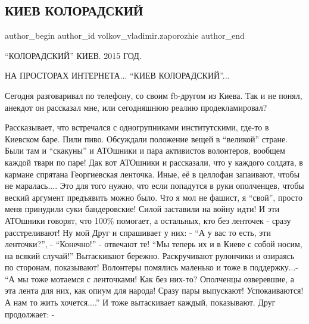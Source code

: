  
 
 
 
 
 
\subsection{КИЕВ КОЛОРАДСКИЙ}
\label{sec:31_01_2022.fb.volkov_vladimir.zaporozhie.1.kiev_koloradskij}
 
\ifcmt
 author_begin
   author_id volkov_vladimir.zaporozhie
 author_end
\fi

\enquote{КОЛОРАДСКИЙ} КИЕВ. 2015 ГОД.

НА ПРОСТОРАХ ИНТЕРНЕТА... \enquote{КИЕВ КОЛОРАДСКИЙ}...

Сегодня разговаривал по телефону, со своим fb-другом из Киева. Так и не понял,
анекдот он рассказал мне, или сегодняшнюю реалию продекламировал?


Рассказывает, что встречался с одногрупниками институтскими, где-то в Киевском
баре. Пили пиво. Обсуждали положение вещей в \enquote{великой} стране. Были там и
\enquote{скакуны} и АТОшники и пара активистов волонтеров, вообщем каждой твари по
паре! Дак вот АТОшники и рассказали, что у каждого солдата, в кармане спрятана
Георгиевская ленточка. Иные, её в целлофан запаивают, чтобы не маралась.... Это
для того нужно, что если попадутся в руки ополченцев, чтобы веский аргумент
предъявить можно было. Что я мол не фашист, я \enquote{свой}, просто меня принудили
суки бандеровские! Силой заставили на войну идти! И эти АТОшники говорят, что
100\% помогает, а остальных, кто без ленточек - сразу расстреливают! Ну мой
Друг и спрашивает у них: - \enquote{А у вас то есть, эти ленточки?}, - \enquote{Конечно!} -
отвечают те! \enquote{Мы теперь их и в Киеве с собой носим, на всякий случай!}
Вытаскивают бережно. Раскручивают рулончики и озираясь по сторонам, показывают!
Волонтеры помялись маленько и тоже в поддержку...- \enquote{А мы тоже мотаемся с
ленточками! Как без них-то? Ополченцы озверевшие, а эта лента для них, как
опиум для народа!  Сразу пары выпускают! Успокаиваются! А нам то жить
хочется....} И тоже вытаскивает каждый, показывают. Друг продолжает: -

